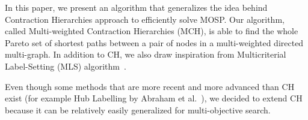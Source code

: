 
In this paper, we present an algorithm that generalizes the idea behind Contraction
Hierarchies approach to efficiently solve MOSP. Our algorithm, called
Multi-weighted Contraction Hierarchies (MCH), is able to find the whole Pareto
set of shortest paths between a pair of nodes in a multi-weighted directed
multi-graph. In addition to CH, we also draw inspiration from Multicriterial
Label-Setting (MLS) algorithm~\cite{martins1984multicriteria}. 

Even though some methods that are more recent and more advanced than CH exist (for example Hub Labelling by Abraham et al.~\cite{abraham2011hub}), we decided to extend CH because it can be relatively easily generalized for multi-objective search. 









